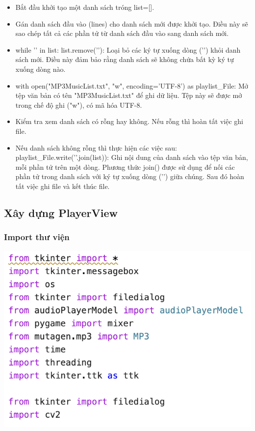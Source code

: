 \documentclass[a4paper]{article}
\begin{document}
\begin{itemize}
    \item Bắt đầu khởi tạo một danh sách tróng list=[].
    \item Gán danh sách đầu vào (lines) cho danh sách mới được khởi tạo. Điều này sẽ sao chép tất cả các phần tử từ danh sách đầu vào sang danh sách mới.
    \item while '\n' in list: list.remove('\n'): Loại bỏ các ký tự xuống dòng ('\n') khỏi danh sách mới. Điều này đảm bảo rằng danh sách sẽ không chứa bất kỳ ký tự xuống dòng nào.
    \item with open("MP3MusicList.txt", "w", encoding='UTF-8') as playlist\_File: Mở tệp văn bản có tên "MP3MusicList.txt" để ghi dữ liệu. Tệp này sẽ được mở trong chế độ ghi ("w"), có mã hóa UTF-8.
    \item Kiểm tra xem danh sách có rỗng hay không. Nếu rỗng thì hoàn tất việc ghi file.
    \item Nếu danh sách không rỗng thì thực hiện các việc sau: playlist\_File.write('\n'.join(list)): Ghi nội dung của danh sách vào tệp văn bản, mỗi phần tử trên một dòng. Phương thức join() được sử dụng để nối các phần tử trong danh sách với ký tự xuống dòng ('\n') giữa chúng. Sau đó hoàn tất việc ghi file và kết thúc file.
\end{itemize}

\subsection{Xây dựng PlayerView}
\subsubsection{Import thư viện}

\begin{center}
\includegraphics[width=135mm]{template_SGU 2/importlibary_View.png}
\end{center}
\end{document}
